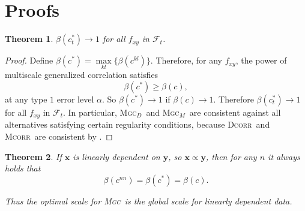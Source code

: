 \documentclass[11pt]{article}
\providecommand{\sct}[1]{{\normalfont\textsc{#1}}}
\providecommand{\mb}[1]{\boldsymbol{#1}}
\providecommand{\mc}[1]{\mathcal{#1}}
\newcommand{\G}{c}
\newcommand{\Mgc}{\sct{Mgc}}
\newcommand{\Mgcd}{\sct{Mgc$_D$}}
\newcommand{\Mgcm}{\sct{Mgc$_M$}}
\newcommand{\Dcorr}{\sct{Dcorr}}
\newcommand{\Mcorr}{\sct{Mcorr}}
\newtheorem{appThm}{Theorem}
\begin{document}

\section{Proofs}
\label{appen:proofs}
\begin{appThm}
$\beta(\G_t^*) \rightarrow 1$ for all $f_{xy}$ in $\mc{F}_t$.
\end{appThm}
\begin{proof}
Define $\beta(\G^{*})=\underset{kl}{\max}\{\beta(\G^{kl})\}$. Therefore, for any $f_{xy}$, the power of multiscale generalized correlation satisfies
\begin{equation*}
\beta(\G^*) \geq \beta(\G),
\end{equation*}
at any type $1$ error level $\alpha$. So $\beta(\G^{*}) \rightarrow 1$ if $\beta(\G) \rightarrow 1$.
% 
Therefore $\beta(\G_t^*) \rightarrow 1$ for all $f_{xy}$ in $\mc{F}_t$. In particular, \Mgcd~and \Mgcm~are consistent against all alternatives satisfying certain regularity conditions, because \Dcorr~and \Mcorr~are consistent by \cite{SzekelyRizzoBakirov2007, SzekelyRizzo2013a}. 
\end{proof}

\begin{appThm}
\label{at:linear}
If $\mb{x}$ is linearly dependent on $\mb{y}$, so $\mb{x} \propto \mb{y}$, then for any $n$ it always holds that
\begin{equation*}
\beta(\G^{nn}) = \beta(\G^{*}) = \beta(\G).
\end{equation*}

Thus the optimal scale for \Mgc~is the global scale for linearly dependent data.
\end{appThm}
\end{document}
